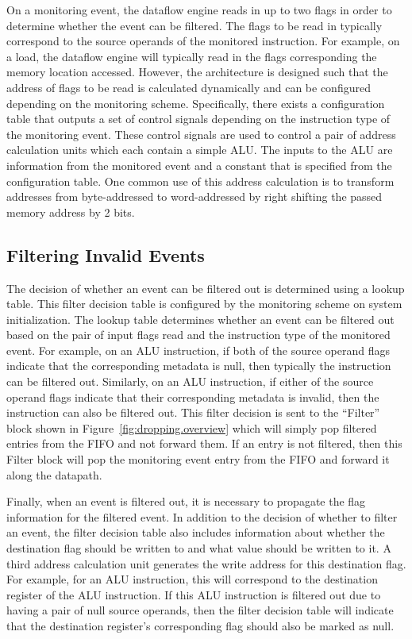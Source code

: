 On a monitoring event, the dataflow engine reads in up to two flags in order to
determine whether the event can be filtered.  The flags to be read in typically correspond to the source
operands of the monitored instruction. For example, on a load, the dataflow
engine will typically read in the flags corresponding the memory location
accessed.
However, the architecture is designed such that the address of flags to be read
is calculated dynamically and can be configured depending on the monitoring
scheme. Specifically, there exists a configuration table that outputs a set of
control signals depending on the instruction type of the monitoring event.
These control signals are used to control a pair of address calculation units which each
contain a simple ALU. The inputs to the ALU are information from the monitored
event and a constant that is specified from the configuration table. One common
use of this address calculation is to transform addresses from byte-addressed
to word-addressed by right shifting the passed memory address by 2 bits.

\subsection{Filtering Invalid Events}
\label{sec:dropping.filter}

The decision of whether an event can be filtered out is determined using a
lookup table. This filter decision table is configured by the monitoring scheme
on system initialization. The lookup table determines whether an event can be
filtered out based on the pair of input flags read and the instruction type of
the monitored event.
For example, on an ALU instruction, if both of the source operand flags
indicate that the corresponding metadata is null, then typically the instruction can be
filtered out. Similarly, on an ALU instruction, if either of the source operand
flags indicate that their corresponding metadata is invalid, then the
instruction can also be filtered out. This filter decision is sent to the
``Filter'' block shown in Figure~\ref{fig:dropping.overview} which will simply pop
filtered entries from the FIFO and not forward them. If an entry is not
filtered, then this Filter block will pop the monitoring event entry from the
FIFO and forward it along the datapath.

Finally, when an event is filtered out, it is necessary to propagate the flag
information for the filtered event. In addition to the decision of whether to
filter an event, the filter decision table also includes information about
whether the destination flag should be written to and what value should be
written to it. A third address calculation unit generates the write address for
this destination flag. For example, for an ALU instruction, this will
correspond to the destination register of the ALU instruction. If this ALU
instruction is filtered out due to having a pair of null source operands, then
the filter decision table will indicate that the destination register's
corresponding flag should also be marked as null. 

